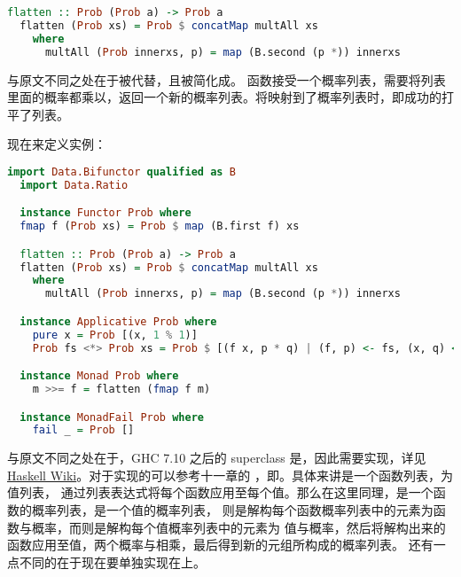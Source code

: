 \documentclass[./main.tex]{subfiles}
\begin{document}
\begin{lstlisting}[language=Haskell]
  flatten :: Prob (Prob a) -> Prob a
  flatten (Prob xs) = Prob $ concatMap multAll xs
    where
      multAll (Prob innerxs, p) = map (B.second (p *)) innerxs
\end{lstlisting}

与原文不同之处在于被代替，且被简化成。
函数接受一个概率列表，需要将列表里面的概率都乘以，返回一个新的概率列表。将映射到了概率列表时，即成功的打平了列表。

现在来定义实例：

\begin{lstlisting}[language=Haskell]
  import Data.Bifunctor qualified as B
  import Data.Ratio

  instance Functor Prob where
  fmap f (Prob xs) = Prob $ map (B.first f) xs

  flatten :: Prob (Prob a) -> Prob a
  flatten (Prob xs) = Prob $ concatMap multAll xs
    where
      multAll (Prob innerxs, p) = map (B.second (p *)) innerxs

  instance Applicative Prob where
    pure x = Prob [(x, 1 % 1)]
    Prob fs <*> Prob xs = Prob $ [(f x, p * q) | (f, p) <- fs, (x, q) <- xs]

  instance Monad Prob where
    m >>= f = flatten (fmap f m)

  instance MonadFail Prob where
    fail _ = Prob []
\end{lstlisting}

与原文不同之处在于，GHC 7.10 之后的 superclass 是，因此需要实现，详见
\href{https://wiki.haskell.org/Typeclassopedia#Definition_3}{Haskell Wiki}。对于实现的\acode{<*>}可以参考十一章的
，即。具体来讲是一个函数列表，为值列表，
通过列表表达式将每个函数应用至每个值。那么在这里同理，是一个函数的概率列表，是一个值的概率列表，
则是解构每个函数概率列表中的元素为函数与概率，而则是解构每个值概率列表中的元素为
值与概率，然后将解构出来的函数应用至值，两个概率与相乘，最后得到新的元组所构成的概率列表。
还有一点不同的在于现在要单独实现在上。
\end{document}
